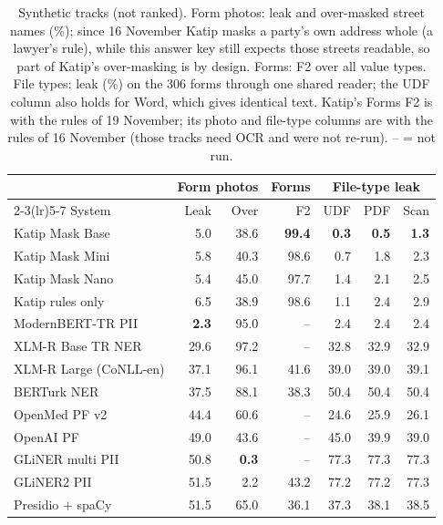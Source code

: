 \documentclass[10pt,twocolumn]{article}
\begin{document}
\begin{table}[t]
\centering\footnotesize
\setlength{\tabcolsep}{2.0pt}
\begin{tabular}{@{}lrrrrrr@{}}
\toprule
& \multicolumn{2}{c}{Form photos} & Forms & \multicolumn{3}{c}{File-type leak} \\
\cmidrule(lr){2-3}\cmidrule(lr){5-7}
System & Leak & Over & F2 & UDF & PDF & Scan \\
\midrule
Katip Mask Base & 5.0 & 38.6 & \textbf{99.4} & \textbf{0.3} & \textbf{0.5} & \textbf{1.3} \\
Katip Mask Mini & 5.8 & 40.3 & 98.6 & 0.7 & 1.8 & 2.3 \\
Katip Mask Nano & 5.4 & 45.0 & 97.7 & 1.4 & 2.1 & 2.5 \\
Katip rules only & 6.5 & 38.9 & 98.6 & 1.1 & 2.4 & 2.9 \\
ModernBERT-TR PII & \textbf{2.3} & 95.0 & -- & 2.4 & 2.4 & 2.4 \\
XLM-R Base TR NER & 29.6 & 97.2 & -- & 32.8 & 32.9 & 32.9 \\
XLM-R Large (CoNLL-en) & 37.1 & 96.1 & 41.6 & 39.0 & 39.0 & 39.1 \\
BERTurk NER & 37.5 & 88.1 & 38.3 & 50.4 & 50.4 & 50.4 \\
OpenMed PF v2 & 44.4 & 60.6 & -- & 24.6 & 25.9 & 26.1 \\
OpenAI PF & 49.0 & 43.6 & -- & 45.0 & 39.9 & 39.0 \\
GLiNER multi PII & 50.8 & \textbf{0.3} & -- & 77.3 & 77.3 & 77.3 \\
GLiNER2 PII & 51.5 & 2.2 & 43.2 & 77.2 & 77.2 & 77.3 \\
Presidio + spaCy & 51.5 & 65.0 & 36.1 & 37.3 & 38.1 & 38.5 \\
\bottomrule
\end{tabular}
\caption{Synthetic tracks (not ranked). Form photos: leak and over-masked street names (\%); since 16 November Katip masks a party's own address whole (a lawyer's rule), while this answer key still expects those streets readable, so part of Katip's over-masking is by design. Forms: F2 over all
value types. File types: leak (\%) on the 306 forms through one shared reader; the UDF column also holds for Word, which gives identical text.
Katip's Forms F2 is with the rules of 19 November; its photo and file-type columns are with the rules of 16 November (those tracks need OCR and were not re-run). -- = not run.}
\label{tab:extra}
\end{table}
\end{document}

